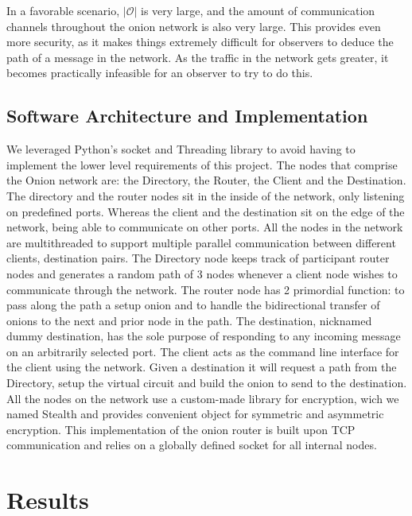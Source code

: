 \documentclass[10pt]{report}
\begin{document}
\hfill \newline
In a favorable scenario, $|\mathcal{O}|$ is very large, and the amount of communication channels
throughout the onion network is also very large. This provides even more security, as it makes
things extremely difficult for observers to deduce the path of a message in the network. As the
traffic in the network gets greater, it becomes practically infeasible for an observer to try to do
this.\\

\section{Software Architecture and Implementation}
We leveraged Python’s socket and Threading library to avoid having to implement the lower level requirements of this project.
The nodes that comprise the Onion network are: the Directory, the Router, the Client and the Destination.
The directory and the router nodes sit in the inside of the network, only listening on predefined ports.
Whereas the client and the destination sit on the edge of the network, being able to communicate on other ports.
All the nodes in the network are multithreaded to support multiple parallel communication between different clients, destination pairs.
The Directory node keeps track of participant router nodes and generates a random path of 3 nodes whenever a client node wishes to communicate through the network.
The router node has 2 primordial function: to pass along the path a setup onion and to handle the bidirectional transfer of onions to the next and prior node in the path.
The destination, nicknamed dummy destination, has the sole purpose of responding to any incoming message on an arbitrarily selected port.
The client acts as the command line interface for the client using the network. Given a destination it will request a path from the Directory, setup the virtual circuit and build the onion to send to the destination.
All the nodes on the network use a custom-made library for encryption, wich we named Stealth and provides convenient object for symmetric and asymmetric encryption.
This implementation of the onion router is built upon TCP communication and relies on a globally defined socket for all internal nodes.\\


\chapter{Results}
\end{document}

